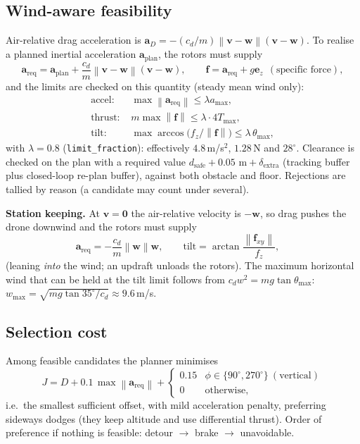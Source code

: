\documentclass[11pt,a4paper]{article}
\newcommand{\vc}[1]{\bm{#1}}
\newcommand{\ez}{\vc{e}_z}
\newcommand{\norm}[1]{\left\lVert #1\right\rVert}
\newcommand{\code}[1]{\texttt{\small #1}}
\begin{document}
\subsection{Wind-aware feasibility}
Air-relative drag acceleration is $\vc a_D=-(c_d/m)\norm{\vc v-\vc w}(\vc v-\vc w)$. To realise a planned inertial acceleration $\vc a_{\text{plan}}$, the rotors must supply
\begin{equation}
\vc a_{\text{req}}=\vc a_{\text{plan}}+\frac{c_d}{m}\norm{\vc v-\vc w}(\vc v-\vc w),\qquad
\vc f=\vc a_{\text{req}}+g\ez\ \ (\text{specific force}),
\end{equation}
and the limits are checked on this quantity (steady mean wind only):
\begin{align}
\text{accel: }&\max\norm{\vc a_{\text{req}}}\le\lambda a_{\max},\\
\text{thrust: }&m\max\norm{\vc f}\le\lambda\cdot4T_{\max},\\
\text{tilt: }&\max\arccos\bigl(f_z/\norm{\vc f}\bigr)\le\lambda\,\theta_{\max},
\end{align}
with $\lambda=0.8$ (\code{limit\_fraction}): effectively $4.8$\,m/s$^2$, $1.28$\,N and $28^\circ$. Clearance is checked on the plan with a required value
$d_{\text{safe}}+0.05\text{ m}+\delta_{\text{extra}}$ (tracking buffer plus closed-loop re-plan buffer), against both obstacle and floor. Rejections are tallied by reason
(a candidate may count under several).

\textbf{Station keeping.} At $\vc v=\vc 0$ the air-relative velocity is $-\vc w$, so drag pushes the drone downwind and the rotors must supply
\begin{equation}
\vc a_{\text{req}}=-\frac{c_d}{m}\norm{\vc w}\vc w,\qquad \text{tilt}=\arctan\frac{\norm{\vc f_{xy}}}{f_z},\quad
\end{equation}
(leaning \emph{into} the wind; an updraft unloads the rotors). The maximum horizontal wind that can be held at the tilt limit follows from
$c_dw^2=mg\tan\theta_{\max}$: $w_{\max}=\sqrt{mg\tan35^\circ/c_d}\approx9.6$\,m/s.

\subsection{Selection cost}
Among feasible candidates the planner minimises
\begin{equation}
J=D+0.1\,\max\norm{\vc a_{\text{req}}}+
\begin{cases}0.15&\phi\in\{90^\circ,270^\circ\}\ (\text{vertical})\\0&\text{otherwise,}\end{cases}
\end{equation}
i.e.\ the smallest sufficient offset, with mild acceleration penalty, preferring sideways dodges (they keep altitude and use differential thrust).
Order of preference if nothing is feasible: detour $\to$ brake $\to$ unavoidable.
\end{document}
